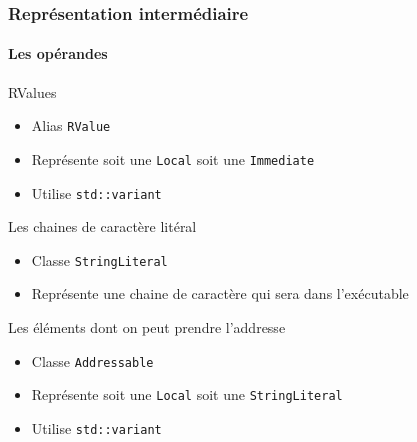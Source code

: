 \documentclass{beamer}
\begin{document}
\begin{frame}
    \frametitle{Représentation intermédiaire}
    \framesubtitle{Les opérandes}

    \begin{block}{RValues}
        \begin{itemize}
            \item Alias \lstinline{RValue}
            \item Représente soit une \lstinline{Local} soit une \lstinline{Immediate}
            \item Utilise \lstinline{std::variant}
        \end{itemize}
    \end{block}
    \pause
    \begin{block}{Les chaines de caractère litéral}
        \begin{itemize}
            \item Classe \lstinline{StringLiteral}
            \item Représente une chaine de caractère qui sera dans l'exécutable
        \end{itemize}
    \end{block}
    \pause
    \begin{block}{Les éléments dont on peut prendre l'addresse}
        \begin{itemize}
            \item Classe \lstinline{Addressable}
            \item Représente soit une \lstinline{Local} soit une \lstinline{StringLiteral}
            \item Utilise \lstinline{std::variant}
        \end{itemize}
        
    \end{block}

\end{frame}
\end{document}
